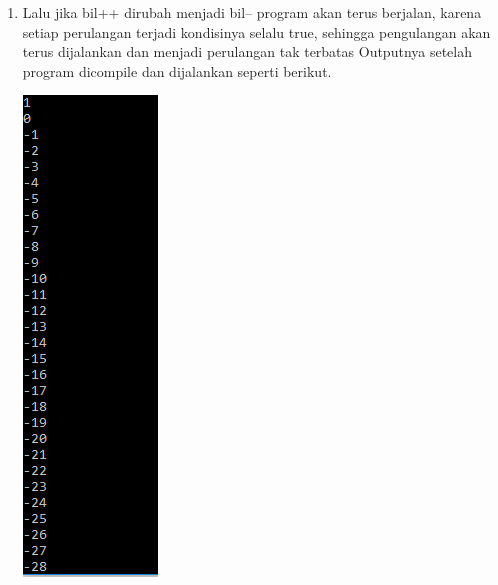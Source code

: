 \documentclass[a4paper,12pt]{article}
\begin{document}
\begin{enumerate}[label=\alph*.]
	\item 
	\begin{minipage}[t]{\linewidth}
		\raggedright
	\end{minipage}
	Lalu jika bil++ dirubah menjadi bil-- program akan terus berjalan, karena setiap perulangan terjadi kondisinya selalu true, sehingga pengulangan akan terus dijalankan dan menjadi perulangan tak terbatas
	Outputnya setelah program dicompile dan dijalankan seperti berikut.\\
	\begin{center}
		\includegraphics[scale=1]{Capture4}
	\end{center}
\end{enumerate}
\end{document}
